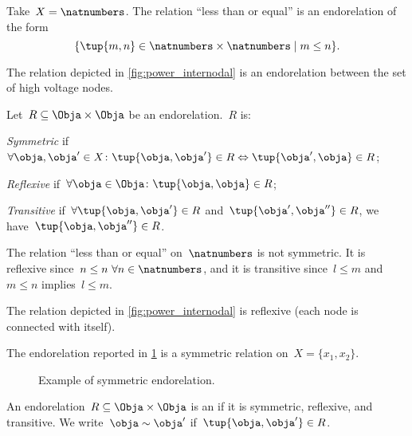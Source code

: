 \begin{example}
    Take~$X=\natnumbers$. The relation ``less than or equal'' is an endorelation of the form
    \begin{equation*}
        \{\tup{m,n}\in \natnumbers\times \natnumbers\mid m\leq n\}.
    \end{equation*}
\end{example}

\begin{example}
    The relation depicted in \cref{fig:power_internodal} is an endorelation between the set of high voltage nodes.
\end{example}

\begin{definition}
    \label{def:properties-endorelations}
    Let~$R\subseteq \Obja\times \Obja$ be an endorelation.~$R$ is:
    \begin{compactitem}
        \item \emph{Symmetric} if~$\forall \obja, \obja'\in X\colon \tup{\obja,\obja'}\in R \Leftrightarrow \tup{\obja',\obja}\in R$;
        \item \emph{Reflexive} if~$\forall \obja\in \Obja\colon \tup{\obja,\obja}\in R$;
        \item \emph{Transitive} if~$\forall \tup{\obja,\obja'}\in R$ and~$\tup{\obja',\obja''}\in R$, we have~$\tup{\obja, \obja''}\in R$.
    \end{compactitem}
\end{definition}

\begin{example}
    The relation ``less than or equal'' on~$\natnumbers$ is not symmetric. It is reflexive since~$n\leq n \ \forall n\in \natnumbers$, and it is transitive since~$l\leq m$ and~$m\leq n$ implies~$l\leq m$.
\end{example}

\begin{example}
    The relation depicted in \cref{fig:power_internodal} is reflexive (each node is connected with itself).
\end{example}

\begin{example}
    The endorelation reported in \cref{fig:ex_sym_rel} is a symmetric relation on~$X=\{x_1,x_2\}$.
    \begin{figure}[h!]
        \begin{center}
        \end{center}
        \caption{Example of symmetric endorelation.}
        \label{fig:ex_sym_rel}
    \end{figure}
\end{example}
\begin{definition}
    \label{def:equivalence-relation}
    An endorelation~$R\subseteq \Obja\times \Obja$ is an \emph{} if it is symmetric, reflexive, and transitive. We write~$\obja\sim \obja'$ if~$\tup{\obja,\obja'}\in R$.
\end{definition}

